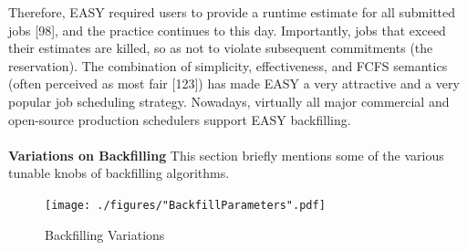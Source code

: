 Therefore, EASY required users to provide a runtime estimate for all submitted jobs [98], and the practice continues to this day. Importantly, jobs that exceed their estimates are killed, so as not to violate subsequent commitments (the reservation). The combination of simplicity, effectiveness, and FCFS semantics (often perceived as most fair [123]) has made EASY a very attractive and a very popular job scheduling strategy. Nowadays, virtually all major commercial and open-source production schedulers support EASY backfilling.\\ \\
\textbf{Variations on Backfilling} This section briefly mentions some of the various tunable knobs of backfilling algorithms.
\begin{figure}[!htbp]
\centering
\texttt{[image: ./figures/"BackfillParameters".pdf]}
\caption{Backfilling Variations}
\label{fig:3}
\end{figure}
